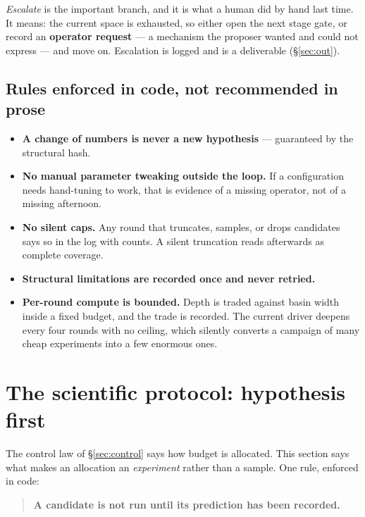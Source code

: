 \documentclass[11pt]{article}
\begin{document}
\emph{Escalate} is the important branch, and it is what a human did by hand last time. It means:
the current space is exhausted, so either open the next stage gate, or record an
\textbf{operator request} --- a mechanism the proposer wanted and could not express --- and move
on. Escalation is logged and is a deliverable (\S\ref{sec:out}).

\subsection{Rules enforced in code, not recommended in prose}

\begin{itemize}\itemsep2pt
\item \textbf{A change of numbers is never a new hypothesis} --- guaranteed by the structural hash.
\item \textbf{No manual parameter tweaking outside the loop.} If a configuration needs hand-tuning
to work, that is evidence of a missing operator, not of a missing afternoon.
\item \textbf{No silent caps.} Any round that truncates, samples, or drops candidates says so in
the log with counts. A silent truncation reads afterwards as complete coverage.
\item \textbf{Structural limitations are recorded once and never retried.}
\item \textbf{Per-round compute is bounded.} Depth is traded against basin width inside a fixed
budget, and the trade is recorded. The current driver deepens every four rounds with no ceiling,
which silently converts a campaign of many cheap experiments into a few enormous ones.
\end{itemize}

\section{The scientific protocol: hypothesis first}
\label{sec:protocol}

The control law of \S\ref{sec:control} says how budget is allocated. This section says what makes
an allocation an \emph{experiment} rather than a sample. One rule, enforced in code:

\begin{quote}
\textbf{A candidate is not run until its prediction has been recorded.}
\end{quote}
\end{document}
